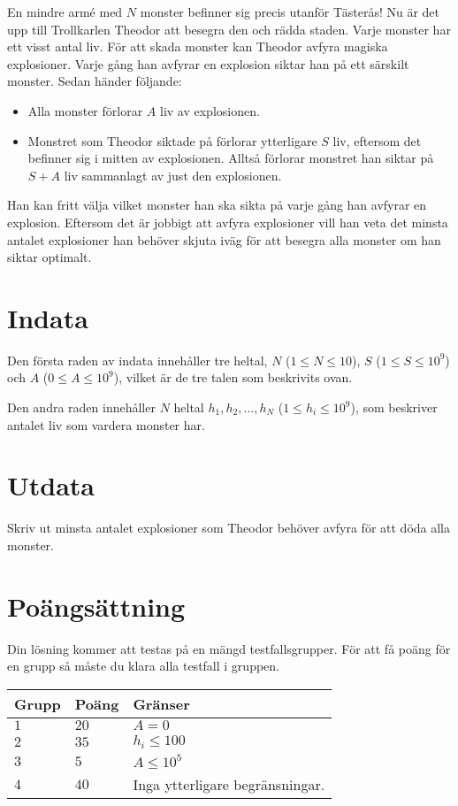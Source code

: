 
\noindent

En mindre armé med $N$ monster befinner sig precis utanför Tästerås! Nu är det upp
till Trollkarlen Theodor att besegra den och rädda staden. Varje monster har ett visst
antal liv. För att skada monster kan
Theodor avfyra magiska explosioner. Varje gång han avfyrar en explosion siktar han på ett
särskilt monster. Sedan händer följande:
\begin{itemize}
  \item Alla monster förlorar $A$ liv av explosionen.
  \item Monstret som Theodor siktade på förlorar ytterligare $S$ liv, 
  eftersom det befinner sig i mitten av explosionen. Alltså förlorar monstret han siktar
  på $S+A$ liv sammanlagt av just den explosionen.
\end{itemize}
Han kan fritt välja vilket monster han ska sikta på varje gång han avfyrar en explosion.
Eftersom det är jobbigt att avfyra explosioner vill han veta det minsta antalet
explosioner han behöver skjuta iväg för att besegra alla monster om han siktar optimalt.

\section*{Indata}
Den första raden av indata innehåller tre heltal, $N$ ($1 \leq N \leq 10$), $S$ ($1 \leq S \leq 10^9$) och $A$ ($0 \leq A \leq 10^9$),
vilket är de tre talen som beskrivits ovan.

Den andra raden innehåller $N$ heltal $h_1, h_2, \ldots, h_N$ ($1 \leq h_i \leq 10^9$), som beskriver antalet liv som vardera monster har.

\section*{Utdata}
Skriv ut minsta antalet explosioner som Theodor behöver avfyra för att döda alla monster.


\section*{Poängsättning}
Din lösning kommer att testas på en mängd testfallsgrupper.
För att få poäng för en grupp så måste du klara alla testfall i gruppen.

\noindent
\begin{tabular}{| l | l | p{12cm} |}
  \hline
  \textbf{Grupp} & \textbf{Poäng} & \textbf{Gränser} \\ \hline
  $1$    & $20$       & $A = 0$ \\ \hline
  $2$    & $35$       & $h_i \leq 100$ \\ \hline
  $3$    & $5$        & $A \leq 10^5$ \\ \hline
  $4$    & $40$       & Inga ytterligare begränsningar. \\ \hline
\end{tabular}


